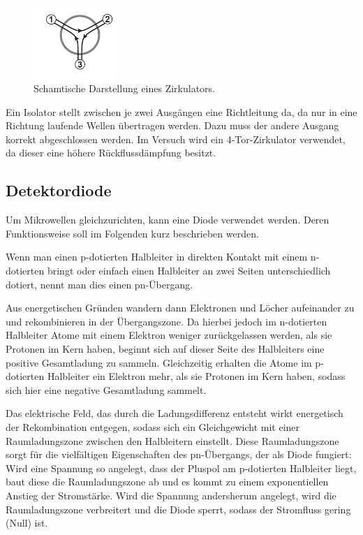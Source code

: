 \documentclass[
	a4paper,
	12pt,
	pagesize,
	ngerman
]{scrartcl}
\begin{document}
	\begin{figure}[H]
		\includegraphics[width=0.3\textwidth]{img/zirkulator.png}
		\centering
		\caption{
			Schamtische Darstellung eines Zirkulators. \cite{Anleitung}
		}
		\label{fig_zirkulator}
		\centering
	\end{figure}

	Ein Isolator stellt zwischen je zwei Ausgängen eine Richtleitung da, da nur in eine Richtung laufende Wellen übertragen werden.
	Dazu muss der andere Ausgang korrekt abgeschlossen werden.
	Im Versuch wird ein 4-Tor-Zirkulator verwendet, da dieser eine höhere Rückflussdämpfung besitzt.

	\subsection{Detektordiode}

	Um Mikrowellen gleichzurichten, kann eine Diode verwendet werden.
	Deren Funktionsweise soll im Folgenden kurz beschrieben werden.

	Wenn man einen p-dotierten Halbleiter in direkten Kontakt mit einem n-dotierten bringt oder einfach einen Halbleiter an zwei Seiten unterschiedlich dotiert, nennt man dies einen pn-Übergang.

	Aus energetischen Gründen wandern dann Elektronen und Löcher aufeinander zu und rekombinieren in der Übergangszone.
	Da hierbei jedoch im n-dotierten Halbleiter Atome mit einem Elektron weniger zurückgelassen werden, als sie Protonen im Kern haben, beginnt sich auf dieser Seite des Halbleiters eine positive Gesamtladung zu sammeln.
	Gleichzeitig erhalten die Atome im p-dotierten Halbleiter ein Elektron mehr, als sie Protonen im Kern haben, sodass sich hier eine negative Gesamtladung sammelt.

	Das elektrische Feld, das durch die Ladungsdifferenz entsteht wirkt energetisch der Rekombination entgegen, sodass sich ein Gleichgewicht mit einer Raumladungszone zwischen den Halbleitern einstellt.
	Diese Raumladungszone sorgt für die vielfältigen Eigenschaften des pn-Übergangs, der als Diode fungiert:
	Wird eine Spannung so angelegt, dass der Pluspol am p-dotierten Halbleiter liegt, baut diese die Raumladungszone ab und es kommt zu einem exponentiellen Anstieg der Stromstärke.
	Wird die Spannung andersherum angelegt, wird die Raumladungszone verbreitert und die Diode sperrt, sodass der Stromfluss gering (Null) ist.
\end{document}
